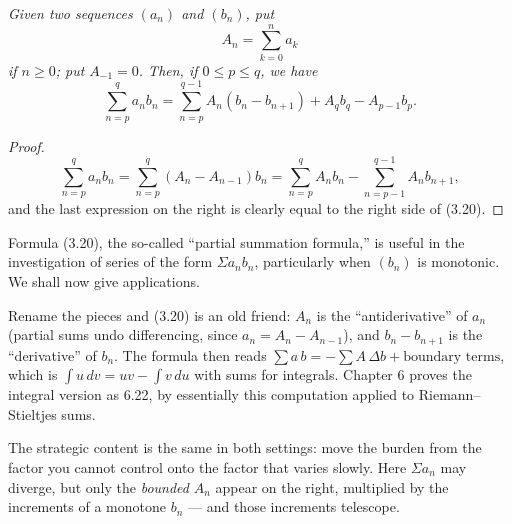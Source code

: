 \emph{Given two sequences $(a_n)$ and $(b_n)$, put}
\[ A_n = \sum_{k=0}^{n} a_k \]
\emph{if $n \ge 0$; put $A_{-1} = 0$. Then, if $0 \le p \le q$, we have}
\begin{equation}
  \sum_{n=p}^{q} a_nb_n = \sum_{n=p}^{q-1} A_n(b_n - b_{n+1})
  + A_qb_q - A_{p-1}b_p. \tag{3.20}
\end{equation}

\begin{proof}
\[ \sum_{n=p}^{q} a_nb_n = \sum_{n=p}^{q} (A_n - A_{n-1})b_n
   = \sum_{n=p}^{q} A_nb_n - \sum_{n=p-1}^{q-1} A_nb_{n+1}, \]
and the last expression on the right is clearly equal to the right side of
(3.20).
\end{proof}

Formula (3.20), the so-called ``partial summation formula,'' is useful in the
investigation of series of the form $\Sigma a_nb_n$, particularly when $(b_n)$
is monotonic. We shall now give applications.

\begin{deeper}
Rename the pieces and (3.20) is an old friend: $A_n$ is the ``antiderivative''
of $a_n$ (partial sums undo differencing, since $a_n = A_n - A_{n-1}$), and
$b_n - b_{n+1}$ is the ``derivative'' of $b_n$. The formula then reads
$\sum a\,b = -\sum A\,\Delta b + \text{boundary terms}$, which is
$\int u\,dv = uv - \int v\,du$ with sums for integrals. Chapter 6 proves the
integral version as 6.22, by essentially this computation applied to
Riemann--Stieltjes sums.

The strategic content is the same in both settings: move the burden from the
factor you cannot control onto the factor that varies slowly. Here $\Sigma a_n$
may diverge, but only the \emph{bounded} $A_n$ appear on the right, multiplied
by the increments of a monotone $b_n$ --- and those increments telescope.
\end{deeper}

